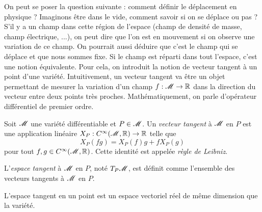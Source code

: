 \documentclass[a4paper,11pt]{report}
\begin{document}
                On peut se poser la question suivante : comment définir le déplacement en physique ? Imaginons être dans le vide, comment savoir si on se déplace ou pas ? S'il y a un champ dans cette région de l'espace (champ de densité de masse, champ électrique, ...), on peut dire que l'on est en mouvement si on observe une variation de ce champ. On pourrait aussi déduire que c'est le champ qui se déplace et que nous sommes fixe.  Si le champ est réparti dans tout l'espace, c'est une notion équivalente. Pour cela, on introduit la notion de vecteur tangent à un point d'une variété. Intuitivement, un vecteur tangent va être un objet permettant de mesurer la variation d'un champ $f:\mathscr{M}\to\mathbb{R}$ dans la direction du vecteur entre deux points très proches. Mathématiquement, on parle d'opérateur différentiel de premier ordre.
                
                \begin{definition}
                    Soit $\mathscr{M}$ une variété différentiable et $P\in\mathscr{M}$. Un \textit{vecteur tangent} à $\mathscr{M}$ en $P$ est une application linéaire $X_P:C^\infty(\mathscr{M},\mathbb{R})\to\mathbb{R}$ telle que
                    \begin{equation}
                        X_P(fg) = X_P(f)g+fX_P(g)
                    \end{equation}
                    pour tout $f,g\in C^\infty(\mathscr{M},\mathbb{R})$. Cette identité est appelée \textit{règle de Leibniz}.
                \end{definition}
                
                \begin{definition}
                    L'\textit{espace tangent} à $\mathscr{M}$ en $P$, noté $T_P\mathscr{M}$, est définit comme l'ensemble des vecteurs tangents à $\mathscr{M}$ en $P$.
                \end{definition}
                
                \begin{prop}
                \begin{leftbar}
                    L'espace tangent en un point est un espace vectoriel réel de même dimension que la variété.
                \end{leftbar}
                \end{prop}
                
\end{document}
